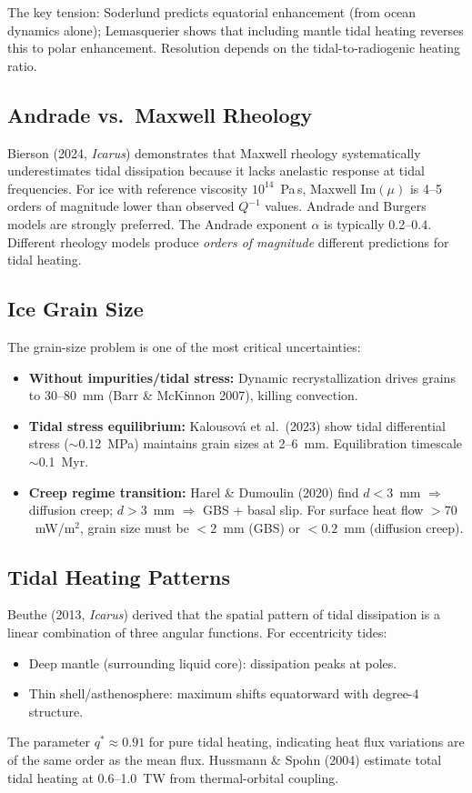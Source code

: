 \documentclass[11pt,letterpaper]{article}
\begin{document}
The key tension: Soderlund predicts equatorial enhancement (from ocean dynamics alone); Lemasquerier shows that including mantle tidal heating reverses this to polar enhancement. Resolution depends on the tidal-to-radiogenic heating ratio.

\subsection{Andrade vs.\ Maxwell Rheology}

Bierson (2024, \textit{Icarus}) demonstrates that Maxwell rheology systematically underestimates tidal dissipation because it lacks anelastic response at tidal frequencies. For ice with reference viscosity $10^{14}$~Pa\,s, Maxwell Im$(\mu)$ is 4--5 orders of magnitude lower than observed $Q^{-1}$ values. Andrade and Burgers models are strongly preferred. The Andrade exponent $\alpha$ is typically 0.2--0.4. Different rheology models produce \textit{orders of magnitude} different predictions for tidal heating.

\subsection{Ice Grain Size}

The grain-size problem is one of the most critical uncertainties:
\begin{itemize}[nosep]
  \item \textbf{Without impurities/tidal stress:} Dynamic recrystallization drives grains to 30--80~mm (Barr \& McKinnon 2007), killing convection.
  \item \textbf{Tidal stress equilibrium:} Kalousov\'{a} et al.\ (2023) show tidal differential stress ($\sim$0.12~MPa) maintains grain sizes at 2--6~mm. Equilibration timescale $\sim$0.1~Myr.
  \item \textbf{Creep regime transition:} Harel \& Dumoulin (2020) find $d < 3$~mm $\Rightarrow$ diffusion creep; $d > 3$~mm $\Rightarrow$ GBS + basal slip. For surface heat flow $> 70$~mW/m$^2$, grain size must be $< 2$~mm (GBS) or $< 0.2$~mm (diffusion creep).
\end{itemize}

\subsection{Tidal Heating Patterns}

Beuthe (2013, \textit{Icarus}) derived that the spatial pattern of tidal dissipation is a linear combination of three angular functions. For eccentricity tides:
\begin{itemize}[nosep]
  \item Deep mantle (surrounding liquid core): dissipation peaks at poles.
  \item Thin shell/asthenosphere: maximum shifts equatorward with degree-4 structure.
\end{itemize}
The parameter $q^* \approx 0.91$ for pure tidal heating, indicating heat flux variations are of the same order as the mean flux. Hussmann \& Spohn (2004) estimate total tidal heating at 0.6--1.0~TW from thermal-orbital coupling.
\end{document}
